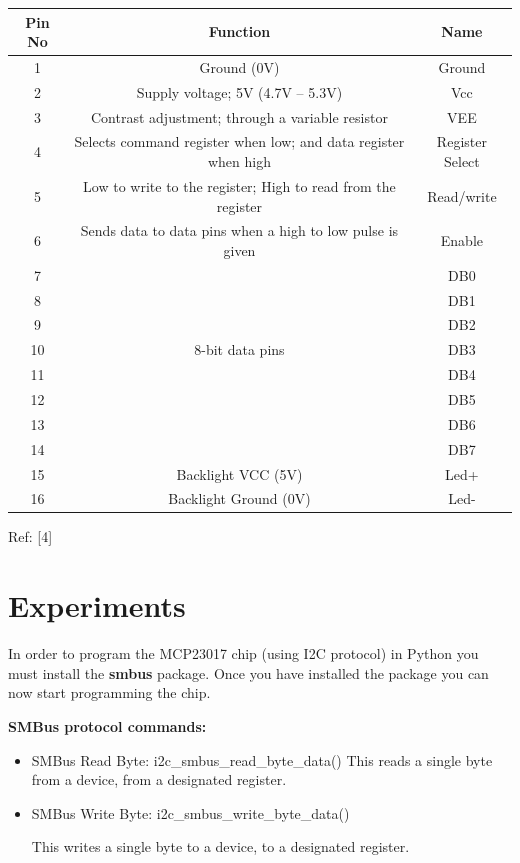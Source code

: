 \documentclass[11pt,a4paper]{article}
\begin{document}
	\begin{tabular}{|c|c|c|}
		\hline
		Pin No & Function & Name \\
		\hline
		1 & Ground (0V) & Ground \\
		\hline
		2 & Supply voltage; 5V (4.7V – 5.3V) & Vcc \\
		\hline
		3 & Contrast adjustment; through a variable resistor & VEE \\
		\hline
		4 & Selects command register when low; and data register when high & Register Select \\
		\hline
		5 & Low to write to the register; High to read from the register & Read/write \\
		\hline
		6 & Sends data to data pins when a high to low pulse is given & Enable \\
		\hline
		7 & & DB0 \\
		\hline
		8 & & DB1 \\
		\hline
        9 & & DB2 \\
        \hline
		10 & 8-bit data pins & DB3 \\
		\hline
		11 & & DB4 \\
		\hline
		12 & & DB5 \\
		\hline
		13 & & DB6 \\
		\hline
		14 & &DB7 \\
		\hline
		15 & Backlight VCC (5V) & Led+ \\
		\hline
		16 & Backlight Ground (0V) & Led- \\
		\hline
	\end{tabular}
	\flushleft
	Ref: [4]
	
	
	\newpage
	\section{Experiments}
	\flushleft
	In order to program the MCP23017 chip (using I2C protocol) in Python you must install the \textbf{smbus} package. Once you have installed the package you can now start programming the chip.
    
    \vspace{0.3cm}
    \textbf{SMBus protocol commands:}
    \begin{itemize}
    	\item SMBus Read Byte:  i2c\_smbus\_read\_byte\_data()
    	This reads a single byte from a device, from a designated register.

    	
        \item SMBus Write Byte:  i2c\_smbus\_write\_byte\_data()
        
        This writes a single byte to a device, to a designated register.
        
    	
    \end{itemize}
    
\end{document}

